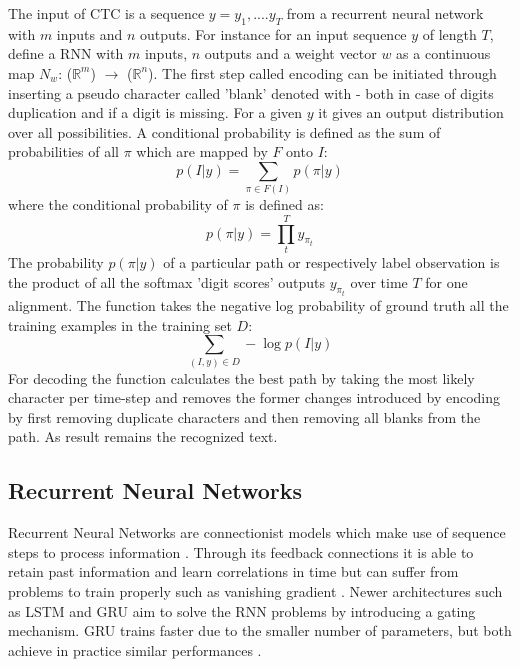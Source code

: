 The input of CTC is a sequence $y=y_{1},....y_{T}$ from a recurrent neural network with $m$ inputs
and $n$ outputs. For instance for an input sequence $y$ of length $T$, define a RNN with $m$ inputs, $n$ outputs and a weight vector $w$ as a continuous map $N_w$: ($\mathbb{R}^m$) $\rightarrow$
($\mathbb{R}^n$). The first step called encoding can be initiated through
inserting a pseudo character called 'blank' denoted with {-} both in case of digits duplication and if a digit is missing. For a given $y$ it gives an output distribution over all possibilities. A
conditional probability is defined as the sum of probabilities of all $\pi$
which are mapped by $F$ onto $I$:
\begin{equation}
p( I | y)=\sum_{\pi \in F(I)} p( \pi | y )
\label{eq1}
\end{equation}
where the conditional probability of $\pi$ is defined as: 
\begin{equation}
p( \pi | y ) =\prod_t^T y_{\pi_{t}}
\label{eq2}
\end{equation}
The probability $p( \pi | y )$ of a particular path or respectively label
observation is the product of all the softmax 'digit scores' outputs $y_{\pi_{t}}$
over time $T$ for one alignment. The function takes the negative log probability
of ground truth all the training examples in the training set $D$:
\begin{equation}
\sum_{(I,y) \in D} - \log  p( I | y )
\label{eq3}
\end{equation}
For decoding the function calculates the best path by taking the most likely
character per time-step and removes the former changes introduced by encoding by first
removing duplicate characters and then removing all blanks from the path. As
result remains the recognized text.

\subsection{Recurrent Neural Networks}\label{subsec:rnn}
Recurrent Neural Networks are connectionist models which make use of
sequence steps to process information \cite{RNN}. Through its feedback
connections it is able to retain past information and learn correlations in time
but can suffer from problems to train properly such as vanishing gradient
\cite{vanishing_gradient}. Newer architectures such as LSTM \cite{LSTM}
and GRU \cite{GRU} aim to solve the RNN problems by introducing a gating
mechanism. GRU trains faster due to the smaller number of parameters, but both
achieve in practice similar performances \cite{LSTMvsGRU}. 